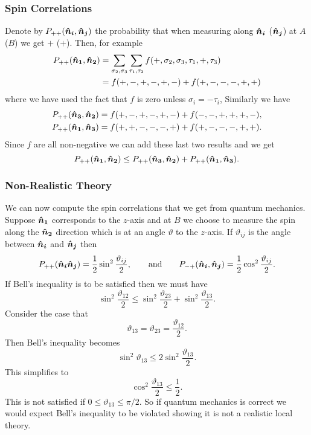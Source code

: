     \subsubsection{Spin Correlations}
    Denote by \(P_{++}(\bm{\hat{n}}\bm{_i}, \bm{\hat{n}}\bm{_j})\) the probability that when measuring along \(\bm{\hat{n}}\bm{_i}\) (\(\bm{\hat{n}}\bm{_j}\)) at \(A\) (\(B\)) we get \(+\) (\(+\)).
    Then, for example
    \begin{align*}
        P_{++}(\bm{\hat{n}}\bm{_1}, \bm{\hat{n}}\bm{_2}) &= \sum_{\sigma_2, \sigma_3} \sum_{\tau_1, \tau_2} f(+, \sigma_2, \sigma_3, \tau_1, +, \tau_3)\\
        &= f(+, -, +, -, +, -) + f(+, -, -, -, +, +)
    \end{align*}
    where we have used the fact that \(f\) is zero unless \(\sigma_i = -\tau_i\),
    Similarly we have
    \begin{align*}
        P_{++}(\bm{\hat{n}}\bm{_3}, \bm{\hat{n}}\bm{_2}) &= f(+, -, +, -, +, -) + f(-, -, +, +, +, -),\\
        P_{++}(\bm{\hat{n}}\bm{_1}, \bm{\hat{n}}\bm{_3}) &= f(+, +, -, -, -, +) + f(+, -, -, -, +, +).
    \end{align*}
    Since \(f\) are all non-negative we can add these last two results and we get
    \[P_{++}(\bm{\hat{n}}\bm{_1}, \bm{\hat{n}}\bm{_2}) \le P_{++}(\bm{\hat{n}}\bm{_3}, \bm{\hat{n}}\bm{_2}) + P_{++}(\bm{\hat{n}}\bm{_1}, \bm{\hat{n}}\bm{_3}).\]
    
    \subsubsection{Non-Realistic Theory}
    We can now compute the spin correlations that we get from quantum mechanics.
    Suppose \(\bm{\hat{n}}\bm{_1}\) corresponds to the \(z\)-axis and at \(B\) we choose to measure the spin along the \(\bm{\hat{n}}\bm{_2}\) direction which is at an angle \(\vartheta\) to the \(z\)-axis.
    If \(\vartheta_{ij}\) is the angle between \(\bm{\hat{n}}\bm{_i}\) and \(\bm{\hat{n}}\bm{_j}\) then
    \[P_{++}(\bm{\hat{n}}\bm{_i}\bm{\hat{n}}\bm{_j}) = \frac{1}{2}\sin^2\frac{\vartheta_{ij}}{2}, \qquad\text{and}\qquad P_{-+}(\bm{\hat{n}}\bm{_i}, \bm{\hat{n}}\bm{_j}) = \frac{1}{2}\cos^2\frac{\vartheta_{ij}}{2}.\]
    If Bell's inequality is to be satisfied then we must have
    \[\sin^2\frac{\vartheta_{12}}{2} \le \sin^2\frac{\vartheta_{23}}{2} + \sin^2\frac{\vartheta_{13}}{2}.\]
    Consider the case that
    \[\vartheta_{13} = \vartheta_{23} = \frac{\vartheta_{12}}{2}.\]
    Then Bell's inequality becomes
    \[\sin^2\vartheta_{13} \le 2\sin^2\frac{\vartheta_{13}}{2}.\]
    This simplifies to
    \[\cos^2\frac{\vartheta_{13}}{2} \le \frac{1}{2}.\]
    This is not satisfied if \(0 \le \vartheta_{13} \le \pi/2\).
    So if quantum mechanics is correct we would expect Bell's inequality to be violated showing it is not a realistic local theory.
    
